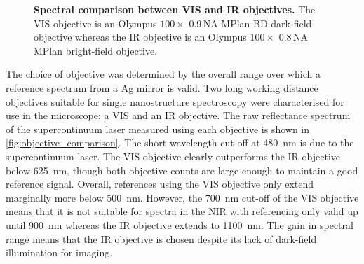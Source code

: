 \documentclass[12pt, a4paper, oneside]{book}
\begin{document}
\begin{figure}[bt]%
\vspace{-10pt}
\centering
{}
{\caption[Spectral comparison between VIS and IR objectives]{\textbf{Spectral comparison between VIS and IR objectives.} The VIS objective is an Olympus $100\times$ 0.9\,NA MPlan BD dark-field objective whereas the IR objective is an Olympus $100\times$ 0.8\,NA MPlan bright-field objective.}
\label{fig:objective_comparison}}
\vspace{-5pt}
\end{figure}

The choice of objective was determined by the overall range over which a reference spectrum from a Ag mirror is valid. Two long working distance objectives suitable for single nanostructure spectroscopy were characterised for use in the microscope: a VIS and an IR objective. The raw reflectance spectrum of the supercontinuum laser measured using each objective is shown in \autoref{fig:objective_comparison}. The short wavelength cut-off at \SI{480}{nm} is due to the supercontinuum laser. The VIS objective clearly outperforms the IR objective below \SI{625}{nm}, though both objective counts are large enough to maintain a good reference signal. Overall, references using the VIS objective only extend marginally more below \SI{500}{nm}. However, the \SI{700}{nm} cut-off of the VIS objective means that it is not suitable for spectra in the NIR with referencing only valid up until \SI{900}{nm} whereas the IR objective extends to \SI{1100}{nm}. The gain in spectral range means that the IR objective is chosen despite its lack of dark-field illumination for imaging.
\end{document}
